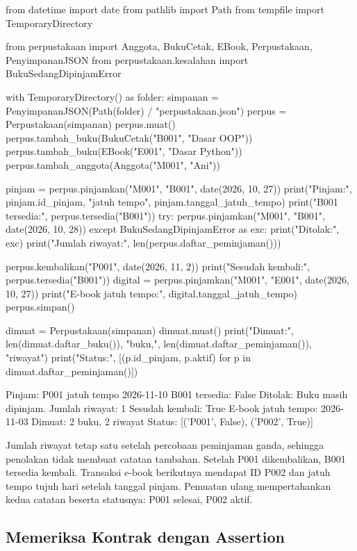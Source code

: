 \begin{kode}
from datetime import date
from pathlib import Path
from tempfile import TemporaryDirectory

from perpustakaan import Anggota, BukuCetak, EBook, Perpustakaan, PenyimpananJSON
from perpustakaan.kesalahan import BukuSedangDipinjamError


with TemporaryDirectory() as folder:
    simpanan = PenyimpananJSON(Path(folder) / "perpustakaan.json")
    perpus = Perpustakaan(simpanan)
    perpus.muat()
    perpus.tambah_buku(BukuCetak("B001", "Dasar OOP"))
    perpus.tambah_buku(EBook("E001", "Dasar Python"))
    perpus.tambah_anggota(Anggota("M001", "Ani"))

    pinjam = perpus.pinjamkan("M001", "B001", date(2026, 10, 27))
    print("Pinjam:", pinjam.id_pinjam, "jatuh tempo", pinjam.tanggal_jatuh_tempo)
    print("B001 tersedia:", perpus.tersedia("B001"))
    try:
        perpus.pinjamkan("M001", "B001", date(2026, 10, 28))
    except BukuSedangDipinjamError as exc:
        print("Ditolak:", exc)
    print("Jumlah riwayat:", len(perpus.daftar_peminjaman()))

    perpus.kembalikan("P001", date(2026, 11, 2))
    print("Sesudah kembali:", perpus.tersedia("B001"))
    digital = perpus.pinjamkan("M001", "E001", date(2026, 10, 27))
    print("E-book jatuh tempo:", digital.tanggal_jatuh_tempo)
    perpus.simpan()

    dimuat = Perpustakaan(simpanan)
    dimuat.muat()
    print("Dimuat:", len(dimuat.daftar_buku()), "buku,",
          len(dimuat.daftar_peminjaman()), "riwayat")
    print("Status:", [(p.id_pinjam, p.aktif) for p in dimuat.daftar_peminjaman()])
\end{kode}

\begin{keluaran}
Pinjam: P001 jatuh tempo 2026-11-10
B001 tersedia: False
Ditolak: Buku masih dipinjam.
Jumlah riwayat: 1
Sesudah kembali: True
E-book jatuh tempo: 2026-11-03
Dimuat: 2 buku, 2 riwayat
Status: [('P001', False), ('P002', True)]
\end{keluaran}

Jumlah riwayat tetap satu setelah percobaan peminjaman ganda, sehingga penolakan tidak membuat catatan tambahan. Setelah P001 dikembalikan, B001 tersedia kembali. Transaksi e-book berikutnya mendapat ID P002 dan jatuh tempo tujuh hari setelah tanggal pinjam. Pemuatan ulang mempertahankan kedua catatan beserta statusnya: P001 selesai, P002 aktif.

\subsection{Memeriksa Kontrak dengan Assertion}

